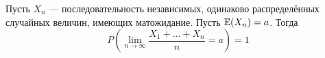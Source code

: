 \begin{comment}
    Если случайные величины распределены одинаково ($\forall\, n \EE(X_n) = a, \DD(X_n) = \sigma^2$), то:
    \[
        \lim\limits_{n \to \infty}\frac{\sigma_1^2 + \ldots + \sigma_n^2}{n^2} = \lim\limits_{n \to \infty}\frac{\sigma^2}{n} = 0
    \]
    и закон переписывается в следующем виде:
    \[
        P\left( \left| \frac{X_1 + \ldots + X_n}{n} - a \right| \geq \epsilon \right) \leq \frac{\sigma^2}{n\epsilon^2} \to 0
    \]
\end{comment}
\begin{theorem}
    Пусть $X_n$ --- последовательность независимых, одинаково
    распределённых случайных величин, имеющих матожидание. Пусть $\mathbb{E}(X_n) = a$. Тогда
    \[
        P\left(
        \lim\limits_{n \to \infty} \frac{X_1 + \ldots + X_n}{n} = a
        \right) = 1
    \]
\end{theorem}

